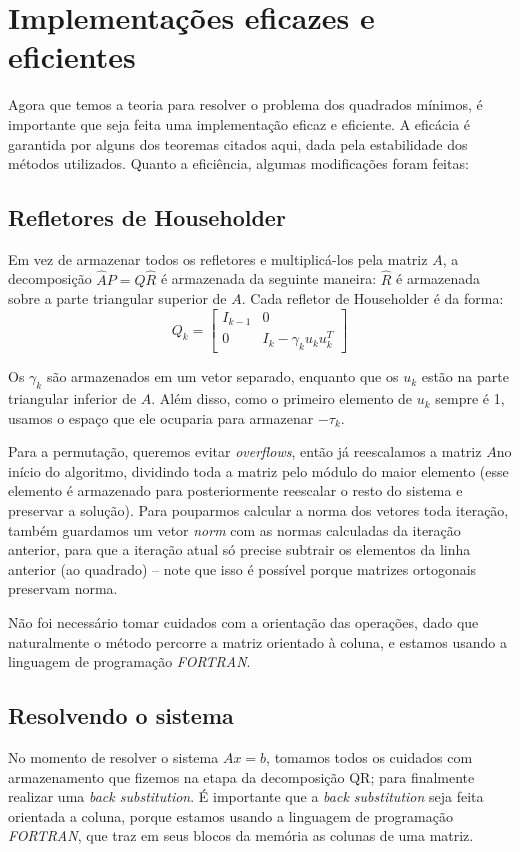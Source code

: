 \documentclass[a4paper,11pt]{article}
\begin{document}
\section{Implementações eficazes e eficientes}
    Agora que temos a teoria para resolver o problema dos quadrados mínimos, é importante que seja feita uma implementação eficaz e eficiente. A eficácia é garantida por alguns dos teoremas citados aqui, dada pela estabilidade dos métodos utilizados. Quanto a eficiência, algumas modificações foram feitas:
    
    \subsection{Refletores de Householder}
        Em vez de armazenar todos os refletores e multiplicá-los pela matriz $A$, a decomposição $\hat{A}P=Q\hat{R}$ é armazenada da seguinte maneira: $\hat{R}$ é armazenada sobre a parte triangular superior de $A$. Cada refletor de Householder é da forma:
        $$
            Q_k =
            \begin{bmatrix}
                I_{k-1} & 0 \\
                0 & I_k-\gamma_k u_k u^T_k
            \end{bmatrix}
        $$
        
        Os $\gamma_k$ são armazenados em um vetor separado, enquanto que os $u_k$ estão na parte triangular inferior de $A$. Além disso, como o primeiro elemento de $u_k$ sempre é 1, usamos o espaço que ele ocuparia para armazenar $-\tau_k$. 
        
        Para a permutação, queremos evitar \textit{overflows}, então já reescalamos a matriz $A$no início do algoritmo, dividindo toda a matriz pelo módulo do maior elemento (esse elemento é armazenado para posteriormente reescalar o resto do sistema e preservar a solução). Para pouparmos calcular a norma dos vetores toda iteração, também guardamos um vetor \textit{norm} com as normas calculadas da iteração anterior, para que a iteração atual só precise subtrair os elementos da linha anterior (ao quadrado) -- note que isso é possível porque matrizes ortogonais preservam norma.
        
        Não foi necessário tomar cuidados com a orientação das operações, dado que naturalmente o método percorre a matriz orientado à coluna, e estamos usando a linguagem de programação \textit{FORTRAN}.
    
    \subsection{Resolvendo o sistema}
        No momento de resolver o sistema $Ax=b$, tomamos todos os cuidados com armazenamento que fizemos na etapa da decomposição QR; para finalmente realizar uma \textit{back substitution}. É importante que a \textit{back substitution} seja feita orientada a coluna, porque estamos usando a linguagem de programação \textit{FORTRAN}, que traz em seus blocos da memória as colunas de uma matriz.
\end{document}
